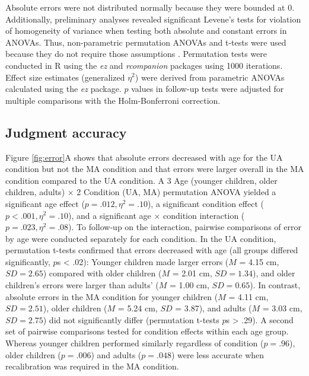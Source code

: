 \documentclass[a4paper,man,natbib,floatsintext,noextraspace]{apa6}
\begin{document}
Absolute errors were not distributed normally because they were bounded at 0. Additionally, preliminary analyses revealed significant Levene’s tests for violation of homogeneity of variance when testing both absolute and constant errors in ANOVAs. Thus, non-parametric permutation ANOVAs and t-tests were used because they do not require those assumptions \citep{Edgington}. Permutation tests were conducted in R using the \textit{ez} and \textit{rcompanion} packages using 1000 iterations. Effect size estimates (generalized $\eta^{2}$) were derived from parametric ANOVAs calculated using the \textit{ez} package. $p$ values in follow-up tests were adjusted for multiple comparisons with the Holm-Bonferroni correction.

\subsection{Judgment accuracy}

Figure \ref{fig:error}A shows that absolute errors decreased with age for the UA condition but not the MA condition and that errors were larger overall in the MA condition compared to the UA condition. A 3 Age (younger children, older children, adults) × 2 Condition (UA, MA) permutation ANOVA yielded a significant age effect ($p = .012, \eta^{2} = .10$), a significant condition effect ($p < .001, \eta^{2} = .10$), and a significant age × condition interaction ($p = .023, \eta^{2} = .08$). To follow-up on the interaction, pairwise comparisons of error by age were conducted separately for each condition. In the UA condition, permutation t-tests confirmed that errors decreased with age (all groups differed significantly, $p$s < .02): Younger children made larger errors ($M$ = 4.15 cm, $SD = 2.65$) compared with older children ($M$ = 2.01 cm, $SD = 1.34$), and older children's errors were larger than adults' ($M$ = 1.00 cm, $SD = 0.65$). In contrast, absolute errors in the MA condition for younger children ($M$ = 4.11 cm, $SD = 2.51$), older children ($M$ = 5.24 cm, $SD$ = 3.87), and adults ($M$ = 3.03 cm, $SD = 2.75$) did not significantly differ (permutation t-tests $p$s > .29). A second set of pairwise comparisons tested for condition effects within each age group. Whereas younger children performed similarly regardless of condition ($p = .96$), older children ($p = .006$) and adults ($p = .048$) were less accurate when recalibration was required in the MA condition.
\end{document}
